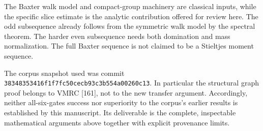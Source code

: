 \documentclass[11pt,a4paper]{article}
\theoremstyle{remark}\newtheorem{remark}[theorem]{Remark}
\numberwithin{equation}{section}
\begin{document}
The Baxter walk model and compact-group machinery are classical inputs,
while the specific slice estimate is the analytic contribution offered
for review here. The odd subsequence already follows from the symmetric
walk model by the spectral theorem. The harder even subsequence needs
both domination and mass normalization. The full Baxter sequence is
not claimed to be a Stieltjes moment sequence.

The corpus snapshot used was commit
\texttt{38348353416f1f7fc50cecb93c3b554a00260c13}.
In particular the structural graph proof belongs to VMRC [161], not to
the new transfer argument. Accordingly, neither all-six-gates success
nor superiority to the corpus's earlier results is established by this
manuscript. Its deliverable is the complete, inspectable mathematical
arguments above together with explicit provenance limits.
\end{document}
